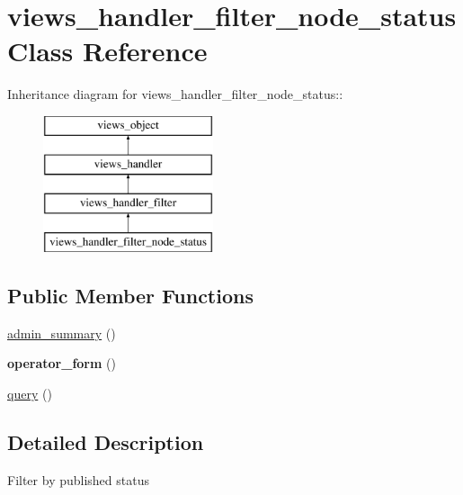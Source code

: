 \hypertarget{classviews__handler__filter__node__status}{
\section{views\_\-handler\_\-filter\_\-node\_\-status Class Reference}
\label{classviews__handler__filter__node__status}
}
Inheritance diagram for views\_\-handler\_\-filter\_\-node\_\-status::\begin{figure}[H]
\begin{center}
\leavevmode
\includegraphics[height=4cm]{classviews__handler__filter__node__status}
\end{center}
\end{figure}
\subsection*{Public Member Functions}
\begin{CompactItemize}
\item 
\hyperlink{classviews__handler__filter__node__status_fad09e6f2c94d8f6748b48c3ce137a25}{admin\_\-summary} ()
\item 
\hypertarget{classviews__handler__filter__node__status_7d3610ca5fd81bba5d90c1bbde7f4ca5}{
\textbf{operator\_\-form} ()}
\label{classviews__handler__filter__node__status_7d3610ca5fd81bba5d90c1bbde7f4ca5}

\item 
\hyperlink{classviews__handler__filter__node__status_4f5351bb3567b5fe8bca111ffca83690}{query} ()
\end{CompactItemize}


\subsection{Detailed Description}
Filter by published status 

